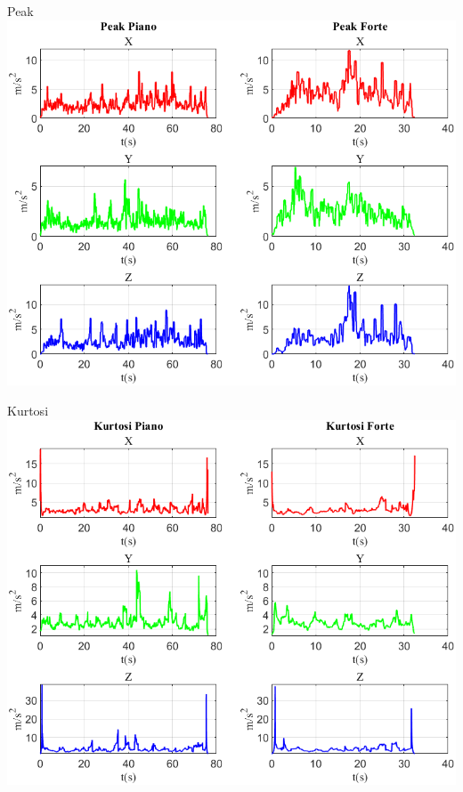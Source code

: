 \documentclass[beamer]{standalone}
\begin{document}
	\begin{frame}{{Peak}}
		\centering\includegraphics[height=.8\textheight]{figure/Acc/Peak}
	\end{frame}
	
	\begin{frame}{{Kurtosi}}
		\centering\includegraphics[height=.8\textheight]{figure/Acc/Kurtosi}
	\end{frame}
	
\end{document}

